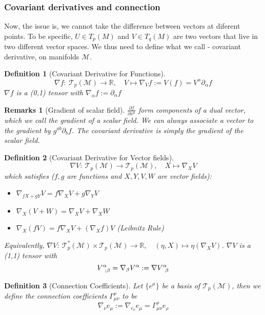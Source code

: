 \documentclass[a4paper]{article}
\newtheorem{remarks}{Remarks}[section]
\theoremstyle{new}
\newtheorem{defi}{Definition}[section]
\begin{document}
\subsubsection{Covariant derivatives and connection}
Now, the issue is, we cannot take the difference between vectors at diferent points. To be specific, $U\in T_p(M)$ and $V\in T_q(M)$ are two vectors that live in two different vector spaces. We thus need to define what we call - covariant derivative, on manifolds $\mathcal{M}$.
\begin{defi}[Covariant Derivative for Functions]
$$\nabla  f:~\mathcal{T}_p(\mathcal{M})\rightarrow\mathbb{R},\quad V\mapsto\nabla_Vf:=V(f)=V^\alpha\partial_\alpha f$$
$\nabla f$ is a (0,1) tensor with $\nabla_\alpha f:=\partial_\alpha f$
\end{defi}
\begin{remarks}[Gradient of scalar field]
$\frac{\partial f}{\partial x^a}$ form components of a dual vector, which we call the gradient of a scalar field. We can always associate a vector to the gradient by $g^{ab}\partial_bf$. The covariant derivative is simply the gradient of the scalar field.
\end{remarks}
\begin{defi}[Covariant Derivative for Vector fields]
$$\nabla  V:~\mathcal{T}_p(\mathcal{M})\rightarrow\mathcal{T}_p(\mathcal{M}),\quad X\mapsto\nabla_XV$$
which satisfies ($f,g$ are functions and $X,Y,V,W$ are vector fields):
\begin{itemize}
    \item $\nabla_{fX+gY}V=f\nabla_XV+g\nabla_YV$
    \item $\nabla_X(V+W)=\nabla_XV+\nabla_XW$
    \item $\nabla_X(fV)=f\nabla_XV+(\nabla_Xf)V$ (Leibnitz Rule)
\end{itemize}
Equivalently, $\nabla V:~\mathcal{T}_p^*(\mathcal{M})\times \mathcal{T}_p(\mathcal{M})\rightarrow\mathbb{R},\quad (\eta,X)\mapsto\eta(\nabla_XV)$. $\nabla V$ is a (1,1) tensor with $$\tensor*{V}{*_{}^{\alpha}_{;\beta}}=\nabla_\beta V^\alpha:=\tensor*{\nabla V}{*_{}^{\alpha}_{\beta}}$$ 
\end{defi}
\begin{defi}[Connection Coefficients]
Let $\{e^\mu\}$ be a basis of $\mathcal{T}_p(\mathcal{M})$, then we define the connection coefficients $\Gamma^\rho_{\mu\nu}$ to be
$$\nabla_\nu e_\mu:=\nabla_{e_\nu}e_\mu=\Gamma_{\mu\nu}^\rho e_\rho$$
\end{defi}
\end{document}
